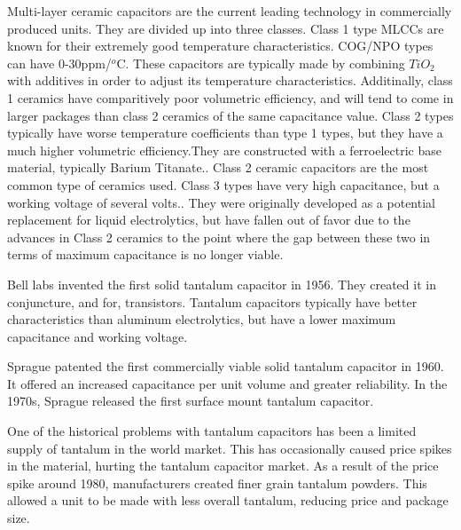 \noindent Multi-layer ceramic capacitors are the current leading technology in commercially produced units. They are divided up into three classes. Class 1 type MLCCs are known for their extremely good temperature characteristics. COG/NPO types can have 0-30ppm/$^o$C. These capacitors are typically made by combining $TiO_2$ with additives in order to adjust its temperature characteristics\cite{intro_cerCaps}. Additinally, class 1 ceramics have comparitively poor volumetric efficiency, and will tend to come in larger packages than class 2 ceramics of the same capacitance value. Class 2 types typically have worse temperature coefficients than type 1 types, but they have a much higher volumetric efficiency.They are constructed with a ferroelectric base material, typically Barium Titanate.\cite{intro_cerCaps}. Class 2 ceramic capacitors are the most common type of ceramics used. Class 3 types have very high capacitance, but a working voltage of several volts.\cite{hist_cerFilt}\cite[Ch 3 Sec VI]{cerMaterials}\cite{atCer_tempco}. They were originally developed as a potential replacement for liquid electrolytics, but have fallen out of favor due to the advances in Class 2 ceramics to the point where the gap between these two in terms of maximum capacitance is no longer viable\cite{wiki_cer}.

\noindent Bell labs invented the first solid tantalum capacitor in 1956. They created it in conjuncture, and for, transistors.\cite[f.~56-64]{dumInv} Tantalum capacitors typically have better characteristics than aluminum electrolytics, but have a lower maximum capacitance and working voltage.\cite{learn_caps}

\noindent Sprague patented the first commercially viable solid tantalum capacitor in 1960. It offered an increased capacitance per unit volume and greater reliability.\cite{charTant} In the 1970s, Sprague released the first surface mount tantalum capacitor.\cite{spragueHist}

\noindent One of the historical problems with tantalum capacitors has been a limited supply of tantalum in the world market. This has occasionally caused price spikes in the material, hurting the tantalum capacitor market. As a result of the price spike around 1980, manufacturers created finer grain tantalum powders. This allowed a unit to be made with less overall tantalum, reducing price and package size.\cite[ch~3.1]{tantMis}
